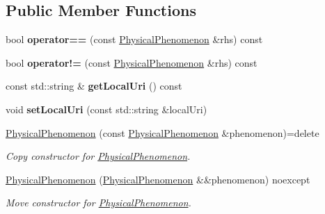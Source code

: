 \subsection*{Public Member Functions}
\begin{DoxyCompactItemize}
\item 
\mbox{\label{classomexmeta_1_1PhysicalPhenomenon_a1c3322453b3c6831668ffa98d9f4b6af}} 
bool {\bfseries operator==} (const \hyperlink{classomexmeta_1_1PhysicalPhenomenon}{Physical\+Phenomenon} \&rhs) const
\item 
\mbox{\label{classomexmeta_1_1PhysicalPhenomenon_a2c726263714e31c7c19d6e73c2c593f8}} 
bool {\bfseries operator!=} (const \hyperlink{classomexmeta_1_1PhysicalPhenomenon}{Physical\+Phenomenon} \&rhs) const
\item 
\mbox{\label{classomexmeta_1_1PhysicalPhenomenon_a2d59ebbc920a40348d102af31ed6661a}} 
const std\+::string \& {\bfseries get\+Local\+Uri} () const
\item 
\mbox{\label{classomexmeta_1_1PhysicalPhenomenon_a84cae9aa96ca00df45b0f81dd8d3ffd4}} 
void {\bfseries set\+Local\+Uri} (const std\+::string \&local\+Uri)
\item 
\mbox{\label{classomexmeta_1_1PhysicalPhenomenon_ad823dad75504adb78975c810e5f1ff94}} 
\hyperlink{classomexmeta_1_1PhysicalPhenomenon_ad823dad75504adb78975c810e5f1ff94}{Physical\+Phenomenon} (const \hyperlink{classomexmeta_1_1PhysicalPhenomenon}{Physical\+Phenomenon} \&phenomenon)=delete
\begin{DoxyCompactList}\small\item\em Copy constructor for \hyperlink{classomexmeta_1_1PhysicalPhenomenon}{Physical\+Phenomenon}. \end{DoxyCompactList}\item 
\mbox{\label{classomexmeta_1_1PhysicalPhenomenon_aeb95aedf1756ded154ec6753108a691e}} 
\hyperlink{classomexmeta_1_1PhysicalPhenomenon_aeb95aedf1756ded154ec6753108a691e}{Physical\+Phenomenon} (\hyperlink{classomexmeta_1_1PhysicalPhenomenon}{Physical\+Phenomenon} \&\&phenomenon) noexcept
\begin{DoxyCompactList}\small\item\em Move constructor for \hyperlink{classomexmeta_1_1PhysicalPhenomenon}{Physical\+Phenomenon}. \end{DoxyCompactList}\item 

\end{DoxyCompactItemize}
